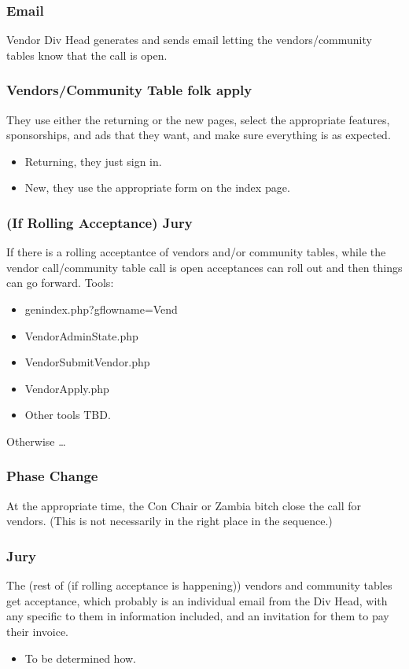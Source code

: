 \documentclass[captions=tablesignature]{scrartcl}
\begin{document}
\subsubsection{Email}
\label{sec-3-2-10}
Vendor Div Head generates and sends email letting the
vendors/community tables know that the call is open.

\subsubsection{Vendors/Community Table folk apply}
\label{sec-3-2-11}
They use either the returning or the new pages, select the
appropriate features, sponsorships, and ads that they want, and
make sure everything is as expected.
\begin{itemize}
\item Returning, they just sign in.
\item New, they use the appropriate form on the index page.
\end{itemize}

\subsubsection{(If Rolling Acceptance) Jury}
\label{sec-3-2-12}
If there is a rolling acceptantce of vendors and/or community
tables, while the vendor call/community table call is open
acceptances can roll out and then things can go forward.
Tools: 
\begin{itemize}
\item genindex.php?gflowname=Vend
\item VendorAdminState.php
\item VendorSubmitVendor.php
\item VendorApply.php
\item Other tools TBD.
\end{itemize}
Otherwise \ldots{}

\subsubsection{Phase Change}
\label{sec-3-2-13}
At the appropriate time, the Con Chair or Zambia bitch close the
call for vendors. (This is not necessarily in the right place in
the sequence.)

\subsubsection{Jury}
\label{sec-3-2-14}
The (rest of (if rolling acceptance is happening)) vendors and
community tables get acceptance, which probably is an individual
email from the Div Head, with any specific to them in information
included, and an invitation for them to pay their invoice.
\begin{itemize}
\item To be determined how.
\end{itemize}
\end{document}
